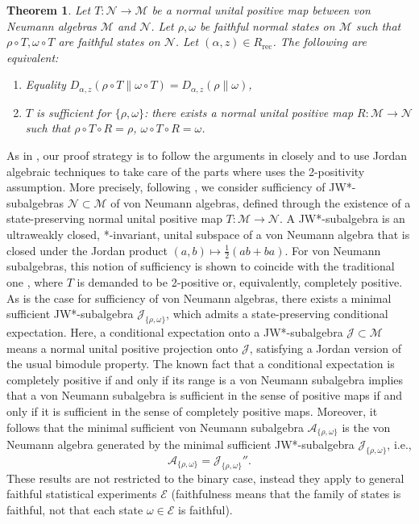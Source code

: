 \documentclass[12pt]{article}
\def\Ne{\mathcal N}
\def\Me{\mathcal M}
\def\Ee{\mathcal E}
\def\Je{\mathcal J}
\def\Ae{\mathcal A}
\newtheorem{introtheorem}{Theorem} %
\theoremstyle{definition}
\theoremstyle{remark}
\begin{document}
\begin{introtheorem}\label{introthm:main}
    Let $T:\Ne \to \Me$ be a normal unital positive map between von Neumann algebras $\Me$ and $\Ne$.
    Let $\rho, \omega$ be faithful normal states on $\Me$ such that $\rho\circ T, \omega\circ T$ are faithful states on $\Ne$.
    Let $(\alpha,z)\in R_{\text{rec}}$. 
    The following are equivalent:
    \begin{enumerate}
        \item Equality $D_{\alpha,z}(\rho\circ T\|\omega\circ T) = D_{\alpha,z}(\rho\|\omega)$,
        \item $T$ is sufficient for $\{\rho,\omega\}$: there exists a normal unital positive map $R:\Me\to \Ne$ such that $\rho\circ T\circ R=\rho$, $\omega\circ T\circ R = \omega$.
    \end{enumerate}
\end{introtheorem}

As in \cite{luijk2026sufficiency}, our proof strategy is to follow the arguments in
\cite{hiai2024alphaz} closely and to use Jordan algebraic techniques to take care of the
parts where \cite{hiai2024alphaz} uses the 2-positivity assumption.
More precisely, following \cite{luijk2026sufficiency}, we consider sufficiency of JW*-subalgebras $\Ne\subset \Me$ of von Neumann algebras, defined through the existence of a state-preserving normal unital positive map $T:\Me\to \Ne$.
A JW*-subalgebra is an ultraweakly closed, *-invariant, unital subspace of a von Neumann algebra that is closed under the Jordan product $(a,b)\mapsto \frac12(ab+ba)$.
For von Neumann subalgebras, this notion of sufficiency is shown to coincide with the traditional one \cite{luijk2026sufficiency,jencova2006sufficiencyfirst}, where $T$ is demanded to be 2-positive or, equivalently, completely positive.
As is the case for sufficiency of von Neumann algebras, there exists a minimal sufficient JW*-subalgebra $\Je_{\{\rho,\omega\}}$, which admits a state-preserving conditional expectation.
Here, a conditional expectation onto a JW*-subalgebra $\Je \subset \Me$ means a normal unital positive projection onto $\Je$, satisfying a Jordan version of the usual bimodule property.
The known fact that a conditional expectation is completely positive if and only if its range is a von Neumann subalgebra implies that a von Neumann subalgebra is sufficient in the sense of positive maps if and only if it is sufficient in the sense of completely positive maps.
Moreover, it follows that the minimal sufficient von Neumann subalgebra $\Ae_{\{\rho,\omega\}}$ is the von Neumann algebra generated by the minimal sufficient JW*-subalgebra $\Je_{\{\rho,\omega\}}$, i.e.,
\begin{equation}
    \Ae_{\{\rho,\omega\}} = \Je_{\{\rho,\omega\}}''.
\end{equation}
These results are not restricted to the binary case, instead they apply to general faithful statistical experiments $\Ee$ (faithfulness means that the family of states is faithful, not that each state $\omega\in\Ee$ is faithful).
\end{document}
